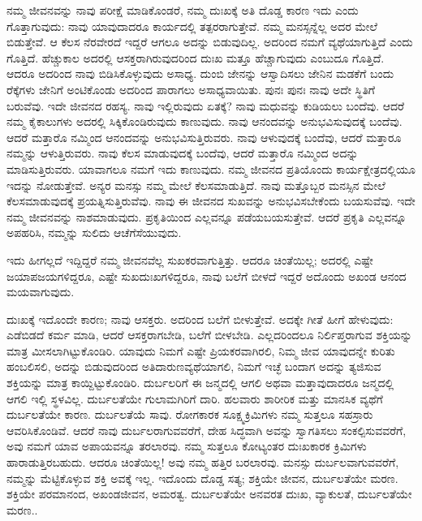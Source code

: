 ನಮ್ಮ ಜೀವನವನ್ನು ನಾವು ಪರೀಕ್ಷೆ ಮಾಡಿಕೊಂಡರೆ, ನಮ್ಮ ದುಃಖಕ್ಕೆ ಅತಿ ದೊಡ್ಡ ಕಾರಣ ಇದು ಎಂದು ಗೊತ್ತಾಗುವುದು: ನಾವು ಯಾವುದಾದರೂ ಕಾರ್ಯದಲ್ಲಿ ತತ್ಪರರಾಗುತ್ತೇವೆ. ನಮ್ಮ ಮನಸ್ಸನ್ನೆಲ್ಲ ಅದರ ಮೇಲೆ ಬಿಡುತ್ತೇವೆ. ಆ ಕೆಲಸ ನೆರವೇರದೆ ಇದ್ದರೆ ಆಗಲೂ ಅದನ್ನು ಬಿಡುವುದಿಲ್ಲ. ಅದರಿಂದ ನಮಗೆ ವ್ಯಥೆಯಾಗುತ್ತಿದೆ ಎಂದು ಗೊತ್ತಿದೆ. ಹೆಚ್ಚುಕಾಲ ಅದರಲ್ಲಿ ಆಸಕ್ತರಾಗಿರುವುದರಿಂದ ದುಃಖ ಮತ್ತೂ ಹೆಚ್ಚಾಗುವುದು ಎಂಬುದೂ ಗೊತ್ತಿದೆ. ಆದರೂ ಅದರಿಂದ ನಾವು ಬಿಡಿಸಿಕೊಳ್ಳುವುದು ಅಸಾಧ್ಯ. ದುಂಬಿ ಜೇನನ್ನು ಆಸ್ವಾದಿಸಲು ಜೇನಿನ ಮಡಕೆಗೆ ಬಂದು ರೆಕ್ಕೆಗಳು ಜೇನಿಗೆ ಅಂಟಿಕೊಂಡು ಅದರಿಂದ ಪಾರಾಗಲು ಅಸಾಧ್ಯವಾಯಿತು. ಪುನಃ ಪುನಃ ನಾವು ಅದೇ ಸ್ಥಿತಿಗೆ ಬರುವೆವು. ಇದೇ ಜೀವನದ ರಹಸ್ಯ. ನಾವು ಇಲ್ಲಿರುವುದು ಏತಕ್ಕೆ? ನಾವು ಮಧುವನ್ನು ಕುಡಿಯಲು ಬಂದೆವು. ಆದರೆ ನಮ್ಮ ಕೈಕಾಲುಗಳು ಅದರಲ್ಲಿ ಸಿಕ್ಕಿಕೊಂಡಿರುವುದು ಕಾಣುವುದು. ನಾವು ಆನಂದವನ್ನು ಅನುಭವಿಸುವುದಕ್ಕೆ ಬಂದೆವು. ಆದರೆ ಮತ್ತಾರೊ ನಮ್ಮಿಂದ ಆನಂದವನ್ನು ಅನುಭವಿಸುತ್ತಿರುವರು. ನಾವು ಆಳುವುದಕ್ಕೆ ಬಂದೆವು, ಆದರೆ ಮತ್ತಾರೂ ನಮ್ಮನ್ನು ಆಳುತ್ತಿರುವರು. ನಾವು ಕೆಲಸ ಮಾಡುವುದಕ್ಕೆ ಬಂದೆವು, ಆದರೆ ಮತ್ತಾರೊ ನಮ್ಮಿಂದ ಅದನ್ನು ಮಾಡಿಸುತ್ತಿರುವರು. ಯಾವಾಗಲೂ ನಮಗೆ ಇದು ಕಾಣುವುದು. ನಮ್ಮ ಜೀವನದ ಪ್ರತಿಯೊಂದು ಕಾರ್ಯಕ್ಷೇತ್ರದಲ್ಲಿಯೂ ಇದನ್ನು ನೋಡುತ್ತೇವೆ. ಅನ್ಯರ ಮನಸ್ಸು ನಮ್ಮ ಮೇಲೆ ಕೆಲಸಮಾಡುತ್ತಿದೆ. ನಾವು ಮತ್ತೊಬ್ಬರ ಮನಸ್ಸಿನ ಮೇಲೆ ಕೆಲಸಮಾಡುವುದಕ್ಕೆ ಪ್ರಯತ್ನಿಸುತ್ತಿರುವೆವು. ನಾವು ಈ ಜೀವನದ ಸುಖವನ್ನು ಅನುಭವಿಸಬೇಕೆಂದು ಬಯಸುವೆವು. ಇದೇ ನಮ್ಮ ಜೀವನವನ್ನು ನಾಶಮಾಡುವುದು. ಪ್ರಕೃತಿಯಿಂದ ಎಲ್ಲವನ್ನೂ ಪಡೆಯಬಯಸುತ್ತೇವೆ. ಆದರೆ ಪ್ರಕೃತಿ ಎಲ್ಲವನ್ನೂ ಅಪಹರಿಸಿ, ನಮ್ಮನ್ನು ಸುಲಿದು ಆಚೆಗೆಸೆಯುವುದು.

ಇದು ಹೀಗಲ್ಲದೆ ಇದ್ದಿದ್ದರೆ ನಮ್ಮ ಜೀವನವೆಲ್ಲ ಸುಖಕರವಾಗುತ್ತಿತ್ತು. ಆದರೂ ಚಿಂತೆಯಿಲ್ಲ; ಅದರಲ್ಲಿ ಎಷ್ಟೇ ಜಯಾಪಜಯಗಳಿದ್ದರೂ, ಎಷ್ಟೇ ಸುಖದುಃಖಗಳಿದ್ದರೂ, ನಾವು ಬಲೆಗೆ ಬೀಳದೆ ಇದ್ದರೆ ಅದೊಂದು ಅಖಂಡ ಆನಂದ ಮಯವಾಗುವುದು.

ದುಃಖಕ್ಕೆ ಇದೊಂದೇ ಕಾರಣ; ನಾವು ಆಸಕ್ತರು. ಅದರಿಂದ ಬಲೆಗೆ ಬೀಳುತ್ತೇವೆ. ಅದಕ್ಕೇ ಗೀತೆ ಹೀಗೆ ಹೇಳುವುದು: ಎಡೆಬಿಡದೆ ಕರ್ಮ ಮಾಡಿ, ಆದರೆ ಆಸಕ್ತರಾಗಬೇಡಿ, ಬಲೆಗೆ ಬೀಳಬೇಡಿ. ಎಲ್ಲದರಿಂದಲೂ ನಿರ್ಲಿಪ್ತರಾಗುವ ಶಕ್ತಿಯನ್ನು ಮಾತ್ರ ಮೀಸಲಾಗಿಟ್ಟುಕೊಂಡಿರಿ. ಯಾವುದು ನಿಮಗೆ ಎಷ್ಟೇ ಪ್ರಿಯಕರವಾಗಿರಲಿ, ನಿಮ್ಮ ಜೀವ ಯಾವುದನ್ನೇ ಕುರಿತು ಹಂಬಲಿಸಲಿ, ಅದನ್ನು ಬಿಡುವುದರಿಂದ ಅತಿದಾರುಣ\break ವ್ಯಥೆಯಾಗಲಿ, ನಿಮಗೆ ಇಚ್ಛೆ ಬಂದಾಗ ಅದನ್ನು ತ್ಯಜಿಸುವ ಶಕ್ತಿಯನ್ನು ಮಾತ್ರ ಕಾಯ್ದಿಟ್ಟುಕೊಂಡಿರಿ. ದುರ್ಬಲರಿಗೆ ಈ ಜನ್ಮದಲ್ಲಿ ಆಗಲಿ ಅಥವಾ ಮತ್ತಾವುದಾದರೂ ಜನ್ಮದಲ್ಲಿ ಆಗಲಿ ಇಲ್ಲಿ ಸ್ಥಳವಿಲ್ಲ. ದುರ್ಬಲತೆಯೇ ಗುಲಾಮಗಿರಿಗೆ ದಾರಿ. ಹಲವಾರು ಶಾರೀರಿಕ ಮತ್ತು ಮಾನಸಿಕ ವ್ಯಥೆಗೆ ದುರ್ಬಲತೆಯೇ ಕಾರಣ. ದುರ್ಬಲತೆಯೆ ಸಾವು. ರೋಗಕಾರಕ ಸೂಕ್ಷ್ಮಕ್ರಿಮಿಗಳು ನಮ್ಮ ಸುತ್ತಲೂ ಸಹಸ್ರಾರು ಆವರಿಸಿಕೊಂಡಿವೆ. ಆದರೆ ನಾವು ದುರ್ಬಲರಾಗುವವರೆಗೆ, ದೇಹ ಸಿದ್ಧವಾಗಿ ಅವನ್ನು ಸ್ವಾಗತಿಸಲು ಸಂಕಲ್ಪಿಸುವವರೆಗೆ, ಅವು ನಮಗೆ ಯಾವ ಅಪಾಯವನ್ನೂ ತರಲಾರವು. ನಮ್ಮ ಸುತ್ತಲೂ ಕೋಟ್ಯಂತರ ದುಃಖಕಾರಕ ಕ್ರಿಮಿಗಳು ಹಾರಾಡುತ್ತಿರಬಹುದು. ಆದರೂ ಚಿಂತೆಯಿಲ್ಲ! ಅವು ನಮ್ಮ ಹತ್ತಿರ ಬರಲಾರವು. ಮನಸ್ಸು ದುರ್ಬಲವಾಗುವವರೆಗೆ, ನಮ್ಮನ್ನು ಮೆಟ್ಟಿಕೊಳ್ಳುವ ಶಕ್ತಿ ಅವಕ್ಕೆ ಇಲ್ಲ. ಇದೊಂದು ದೊಡ್ಡ ಸತ್ಯ; ಶಕ್ತಿಯೇ ಜೀವನ, ದುರ್ಬಲತೆಯೇ ಮರಣ. ಶಕ್ತಿಯೇ ಪರಮಾನಂದ, ಅಖಂಡಜೀವನ, ಅಮರತ್ವ. ದುರ್ಬಲತೆಯೇ ಅನವರತ ದುಃಖ, ವ್ಯಾಕುಲತೆ, ದುರ್ಬಲತೆಯೇ ಮರಣ..

